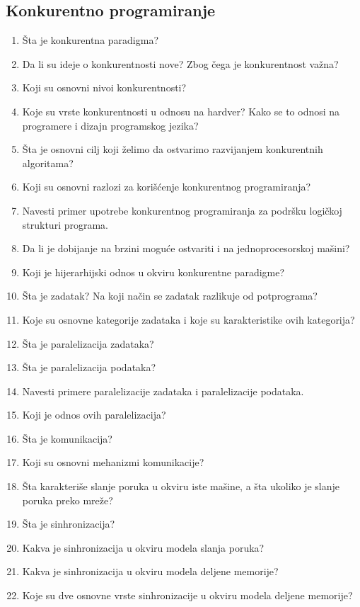 \documentclass[main.tex]{subfiles}
\begin{document}
\begin{multicols}{2}
\begin{enumerate}
\end{enumerate}

\subsection{Konkurentno programiranje}
\begin{enumerate}
\item Šta je konkurentna paradigma?
\item Da li su ideje o konkurentnosti nove? Zbog čega je konkurentnost važna?
\item Koji su osnovni nivoi konkurentnosti?
\item Koje su vrste konkurentnosti u odnosu na hardver? Kako se to odnosi na programere i dizajn programskog jezika?
\item Šta je osnovni cilj koji želimo da ostvarimo razvijanjem konkurentnih algoritama?
\item Koji su osnovni razlozi za korišćenje konkurentnog programiranja?
\item Navesti primer upotrebe konkurentnog programiranja za podršku logičkoj strukturi programa.
\item Da li je dobijanje na brzini moguće ostvariti i na jednoprocesorskoj mašini?
\item Koji je hijerarhijski odnos u okviru konkurentne paradigme?
\item Šta je zadatak? Na koji način se zadatak razlikuje od potprograma?
\item Koje su osnovne kategorije zadataka i koje su karakteristike ovih kategorija?
\item Šta je paralelizacija zadataka?
\item Šta je paralelizacija podataka?
\item Navesti primere paralelizacije zadataka i paralelizacije podataka.
\item Koji je odnos ovih paralelizacija?
\item Šta je komunikacija?
\item Koji su osnovni mehanizmi komunikacije?
\item Šta karakteriše slanje poruka u okviru iste mašine, a šta ukoliko je slanje poruka preko mreže?
\item Šta je sinhronizacija?
\item Kakva je sinhronizacija u okviru modela slanja poruka?
\item Kakva je sinhronizacija u okviru modela deljene memorije?
\item Koje su dve osnovne vrste sinhronizacije u okviru modela deljene memorije?

\end{enumerate}
\end{multicols}
\end{document}
